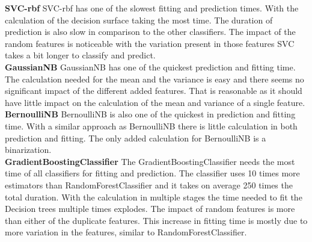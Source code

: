 \documentclass[a4paper,10pt]{article}
\begin{document}
\textbf{SVC-rbf} SVC-rbf has one of the slowest fitting and prediction times. With the calculation of the decision surface taking the most time. The duration of prediction is also slow in comparison to the other classifiers. The impact of the random features is noticeable with the variation present in those features SVC takes a bit longer to  classify and predict. \\

\textbf{GaussianNB} GaussianNB has one of the quickest prediction and fitting time. The calculation needed for the mean and the variance is easy and there seems no significant impact of the different added features. That is reasonable as it should have little impact on the calculation of the mean and variance of a single feature.\\

\textbf{BernoulliNB} BernoulliNB is also one of the quickest in prediction and fitting time. With a similar approach as BernoulliNB there is little calculation in both prediction and fitting. The only added calculation for BernoulliNB is a binarization. \\

\textbf{GradientBoostingClassifier} The GradientBoostingClassifier needs the most time of all classifiers for fitting and prediction. The classifier uses 10 times more estimators than RandomForestClassifier and it takes on average 250 times the total duration. With the calculation in multiple stages the time needed to fit the Decision trees multiple times explodes. The impact of random features is more than either of the duplicate features. This increase in fitting time is mostly due to more variation in the features, similar to RandomForestClassifier. 
  \\

\end{document}
